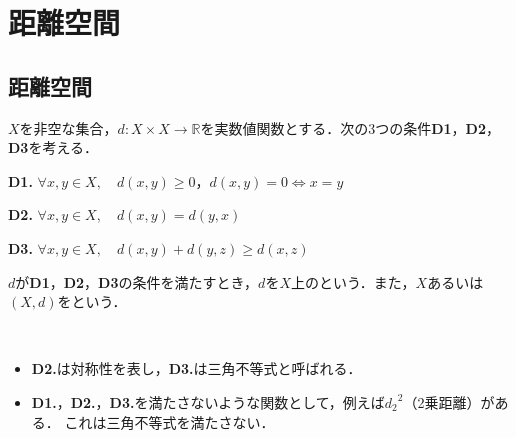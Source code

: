 \documentclass[uplatex]{jsarticle}
\begin{document}
\fi

\section{距離空間}
\subsection{距離空間}
\begin{teigi}[距離空間]
    $X$を非空な集合，$d \colon X \times X \to \mathbb{R}$を実数値関数とする．次の3つの条件\textbf{D1}，\textbf{D2}，\textbf{D3}を考える．
    
    \textbf{D1. } $\forall x, y \in X, \quad d(x,y) \ge 0$，\qquad $d(x,y) = 0 \iff x = y$\par
    \textbf{D2. } $\forall x, y \in X, \quad d(x,y) = d(y,x)$\par
    \textbf{D3. } $\forall x, y \in X, \quad d(x,y) + d(y,z) \ge d(x,z)$
    
    $d$が\textbf{D1}，\textbf{D2}，\textbf{D3}の条件を満たすとき，$d$を$X$上のという．また，$X$あるいは$(X,d)$をという．
\end{teigi}

\begin{remark}~\vspace{-0.5\baselineskip}
    \begin{itemize}
        \item \textbf{D2.}は対称性を表し，\textbf{D3.}は三角不等式と呼ばれる．
        \item \textbf{D1.}，\textbf{D2.}，\textbf{D3.}を満たさないような関数として，例えば${d_{2}}^{2}$（2乗距離）がある．
        これは三角不等式を満たさない．
    \end{itemize}
\end{remark}
\end{document}

